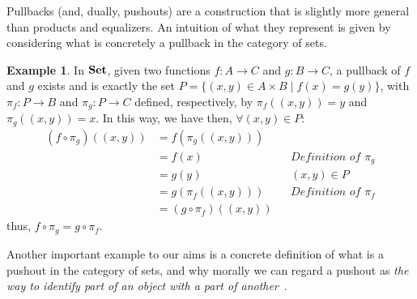 \documentclass[a4paper, twoside,openright]{report}
\theoremstyle{plain}
\theoremstyle{definition}
\newtheorem{example}[theorem]{Example}
\begin{document}
Pullbacks (and, dually, pushouts) are a construction that is slightly more general than products and equalizers. An intuition of what they represent is given by considering what is concretely a pullback in the category of sets.

\begin{example}
    In $\mathbf{Set}$, given two functions $f: A \rightarrow C$ and $g: B \rightarrow C$, a pullback of $f$ and $g$ exists and is exactly the set $P = \{(x, y) \in A \times B \mid f(x) = g(y)\}$, with $\pi_f : P \rightarrow B$ and $\pi_g : P \rightarrow C$ defined, respectively, by $\pi_f((x, y)) = y$ and $\pi_g((x, y)) = x$. In this way, we have then, $\forall (x, y) \in P$:
    \begin{align*}
        (f \circ \pi_g) ((x, y))
                    &= f(\pi_g((x, y)))     &&  \\
                    & = f(x)                &&  \textit{Definition of $\pi_g$} \\
                    & = g(y)                &&  (x, y) \in P \\
                    & = g(\pi_f((x, y)))    &&  \textit{Definition of $\pi_f$} \\
                    & = (g \circ \pi_f) ((x, y)) && 
    \end{align*}
    thus, $f \circ \pi_g = g \circ \pi_f$.
\end{example}


Another important example to our aims is a concrete definition of what is a pushout in the category of sets, and why morally we can regard a pushout as \textit{the way to identify part of an object with a part of another}~\cite{Barr_Wells_1995}.
\end{document}
